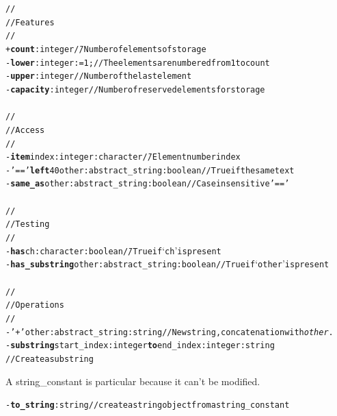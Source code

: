 \documentclass[11pt]{mybook}
\begin{document}
\begin{alltt}
\begin{tabbing}
  //\\
  // Features\\
  //\\
  + {\bf{}count}:{\sc{}integer}             \= // Number of elements of storage \\
  - {\bf{}lower}:{\sc{}integer} := 1;       \> // The elements are numbered from 1 to count \\
  - {\bf{}upper}:{\sc{}integer}             \> // Number of the last element \\
  - {\bf{}capacity}:{\sc{}integer}          \> // Number of reserved elements for storage \\
\\
  //\\
  // Access\\
  // \\
  - {\bf{}item} index:{\sc{}integer} :{\sc{}character}             \= // Element number index \\
  - '==' {\bf{}left} 40 other:{\sc{}abstract\_string} :{\sc{}boolean}  \> // True if the same text \\
  - {\bf{}same\_as} other:{\sc{}abstract\_string} :{\sc{}boolean}      \> // Case insensitive '=='\\
\\
  //\\
  // Testing\\
  //\\
  - {\bf{}has} ch:{\sc{}character} :{\sc{}boolean}                  \= // True if `ch' is present \\
  - {\bf{}has\_substring} other:{\sc{}abstract\_string} :{\sc{}boolean}  \> // True if `other' is present \\
\\
  //\\
  // Operations\\
  //\\
  - '+' other:{\sc{}abstract\_string} :{\sc{}string}   // New {\sc{}string}, concatenation with {\it{}other}.\\
  - {\bf{}substring} start_index:{\sc{}integer} {\bf{}to} end_index:{\sc{}integer} :{\sc{}string} \\
  // Create a substring\\
\end{tabbing}
\end{alltt}

A {\sc{}string\_constant} is particular because it can't be modified.
\begin{alltt}
  - {\bf{}to\_string}:{\sc{}string}    // create a {\sc{}string} object from a {\sc{}string\_constant}
\end{alltt}
\end{document}

